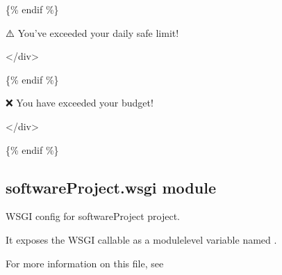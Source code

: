 \documentclass[letterpaper,10pt,english]{sphinxmanual}
\begin{document}
\begin{fulllineitems}
\begin{description}
\sphinxAtStartPar
\{\% endif \%\}
\begin{description}
\begin{description}
\sphinxAtStartPar
⚠️ You’ve exceeded your daily safe limit!

\end{description}

\sphinxAtStartPar
\textless{}/div\textgreater{}

\end{description}

\sphinxAtStartPar
\{\% endif \%\}
\begin{description}
\begin{description}
\sphinxAtStartPar
❌ You have exceeded your budget!

\end{description}

\sphinxAtStartPar
\textless{}/div\textgreater{}

\end{description}

\sphinxAtStartPar
\{\% endif \%\}

\end{description}

\end{fulllineitems}



\subsection{softwareProject.wsgi module}
\label{\detokenize{softwareProject:module-softwareProject.wsgi}}\label{\detokenize{softwareProject:softwareproject-wsgi-module}}
\sphinxAtStartPar
WSGI config for softwareProject project.

\sphinxAtStartPar
It exposes the WSGI callable as a module\sphinxhyphen{}level variable named .

\sphinxAtStartPar
For more information on this file, see
\end{document}
